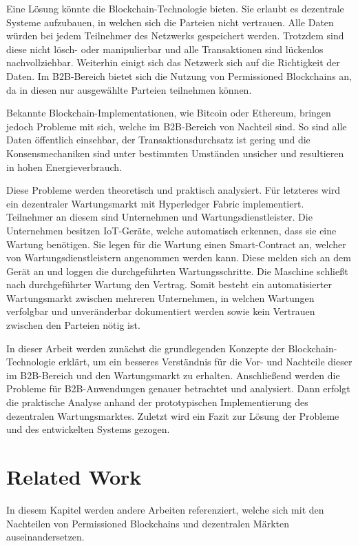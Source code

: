 \documentclass{llncs}
\begin{document}
Eine Lösung könnte die Blockchain-Technologie bieten. Sie erlaubt es dezentrale Systeme aufzubauen, in welchen sich die Parteien nicht vertrauen. Alle Daten würden bei jedem Teilnehmer des Netzwerks gespeichert werden. Trotzdem sind diese nicht lösch- oder manipulierbar und alle Transaktionen sind lückenlos nachvollziehbar. Weiterhin einigt sich das Netzwerk sich auf die Richtigkeit der Daten. Im B2B-Bereich bietet sich die Nutzung von Permissioned Blockchains an, da in diesen nur ausgewählte Parteien teilnehmen können.

Bekannte Blockchain-Implementationen, wie Bitcoin oder Ethereum, bringen jedoch Probleme mit sich, welche im B2B-Bereich von Nachteil sind. So sind alle Daten öffentlich einsehbar, der Transaktionsdurchsatz ist gering und die Konsensmechaniken sind unter bestimmten Umständen unsicher und resultieren in hohen Energieverbrauch.

Diese Probleme werden theoretisch und praktisch analysiert. Für letzteres wird ein dezentraler Wartungsmarkt mit Hyperledger Fabric implementiert. Teilnehmer an diesem sind Unternehmen und Wartungsdienstleister. Die Unternehmen besitzen IoT-Geräte, welche automatisch erkennen, dass sie eine Wartung benötigen. Sie legen für die Wartung einen Smart-Contract an, welcher von Wartungsdienstleistern angenommen werden kann. Diese melden sich an dem Gerät an und loggen die durchgeführten Wartungsschritte. Die Maschine schließt nach durchgeführter Wartung den Vertrag. Somit besteht ein automatisierter Wartungsmarkt zwischen mehreren Unternehmen, in welchen Wartungen verfolgbar und unveränderbar dokumentiert werden sowie kein Vertrauen zwischen den Parteien nötig ist.

In dieser Arbeit werden zunächst die grundlegenden Konzepte der Blockchain-Technologie erklärt, um ein besseres Verständnis für die Vor- und Nachteile dieser im B2B-Bereich und den Wartungsmarkt zu erhalten. Anschließend werden die Probleme für B2B-Anwendungen genauer betrachtet und analysiert. Dann erfolgt die praktische Analyse anhand der prototypischen Implementierung des dezentralen Wartungsmarktes. Zuletzt wird ein Fazit zur Lösung der Probleme und des entwickelten Systems gezogen.

\section{Related Work}
In diesem Kapitel werden andere Arbeiten referenziert, welche sich mit den Nachteilen von Permissioned Blockchains und dezentralen Märkten auseinandersetzen.
\end{document}
